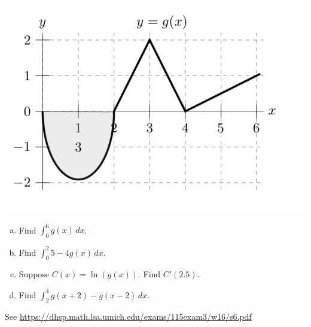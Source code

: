 \documentclass[11pt]{exam}
\begin{document}
\begin{questions}
\vspace{-1em}
\begin{center}
\includegraphics[scale=0.5]{graph2}
\end{center}
\begin{multicols}{2}
\begin{enumerate}[(a)]
	\item Find $\displaystyle\int_{0}^6 g(x) \, dx$.
	\item Find $\displaystyle\int_{0}^2 5 - 4g(x) \, dx$.	
	\item Suppose $C(x)=\ln(g(x))$. Find $C'(2.5).$
	\item Find $\displaystyle\int_{2}^4 g(x+2) - g(x-2) \, dx$.
	\end{enumerate}
	\end{multicols}
        \begin{solution}
          See \href{https://dhsp.math.lsa.umich.edu/exams/115exam3/w16/s6.pdf}{https://dhsp.math.lsa.umich.edu/exams/115exam3/w16/s6.pdf}
        \end{solution}

\end{questions}
\end{document}
